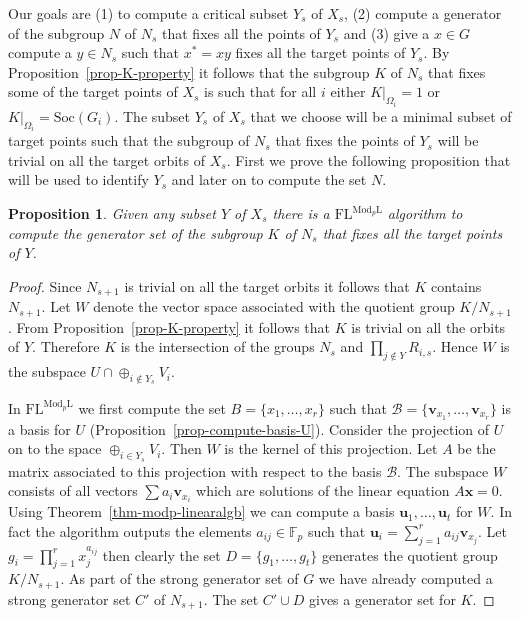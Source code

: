 \documentclass[11pt]{madras}%
\newtheorem{proposition}[theorem]{Proposition}
\theoremstyle{remark}
\newcommand{\ModkL}[1]{{\ensuremath{\mathrm{Mod}_{#1}\mathrm{L}}}}
\newcommand{\pr}[2]{{\ensuremath{\left.{#1}\right\vert_{#2}}}}
\newcommand{\Soc}[1]{{\ensuremath{\mathrm{Soc}\left(#1\right)}}}
\begin{document}
Our goals are (1) to compute a critical subset $Y_s$ of $X_s$, (2)
compute a generator of the subgroup $N$ of $N_s$ that fixes all the
points of $Y_s$ and (3) give a $x \in G$ compute a $y \in N_s$ such
that $x^* = xy$ fixes all the target points of $Y_s$. By
Proposition~\ref{prop-K-property} it follows that the subgroup $K$ of
$N_s$ that fixes some of the target points of $X_s$ is such that for
all $i$ either $\pr{K}{\Omega_i} =1$ or $\pr{K}{\Omega_i} =
\Soc{G_i}$. The subset $Y_s$ of $X_s$ that we choose will be a minimal
subset of target points such that the subgroup of $N_s$ that fixes the
points of $Y_s$ will be trivial on all the target orbits of $X_s$.
First we prove the following proposition that will be used to identify
$Y_s$ and later on to compute the set $N$.

\begin{proposition}\label{prop-compute-K}%
  Given any subset $Y$ of $X_s$ there is a $\mathrm{FL}^\ModkL{p}$
  algorithm to compute the generator set of the subgroup $K$ of $N_s$
  that fixes all the target points of $Y$.
\end{proposition}
\begin{proof}
  Since $N_{s+1}$ is trivial on all the target orbits it follows that
  $K$ contains $N_{s+1}$. Let $W$ denote the vector space associated
  with the quotient group $K/N_{s+1}$. From
  Proposition~\ref{prop-K-property} it follows that $K$ is trivial on
  all the orbits of $Y$. Therefore $K$ is the intersection of the
  groups $N_s$ and $\prod_{j \not \in Y} R_{i,s}$. Hence $W$ is the
  subspace $U \cap \oplus_{i\not \in Y_s} V_i$.

  In $\mathrm{FL}^{\ModkL{p}}$ we first compute the set $B = \{ x_1,
  \ldots, x_r \}$ such that $\mathcal{B} = \{
  \mathbf{v}_{x_1},\ldots,\mathbf{v}_{x_r} \}$ is a basis for $U$
  (Proposition~\ref{prop-compute-basis-U}). Consider the projection of
  $U$ on to the space $\oplus_{i \in Y_s} V_i$. Then $W$ is the kernel
  of this projection. Let $A$ be the matrix associated to this
  projection with respect to the basis $\mathcal{B}$. The subspace $W$
  consists of all vectors $\sum a_i \mathbf{v}_{x_i}$ which are
  solutions of the linear equation $A \mathbf{x} = 0$. Using
  Theorem~\ref{thm-modp-linearalgb} we can compute a basis
  $\mathbf{u}_1,\ldots,\mathbf{u}_t$ for $W$. In fact the algorithm
  outputs the elements $a_{ij} \in \mathbb{F}_p$ such that
  $\mathbf{u}_i = \sum_{j = 1}^r a_{ij} \mathbf{v}_{x_j}$.  Let $g_i =
  \prod_{j =1}^r x_j^{a_{ij}}$ then clearly the set $D = \{
  g_1,\ldots,g_t\}$ generates the quotient group $K/N_{s+1}$.  As part
  of the strong generator set of $G$ we have already computed a strong
  generator set $C'$ of $N_{s+1}$. The set $C' \cup D$ gives a
  generator set for $K$.
\end{proof}
\end{document}
